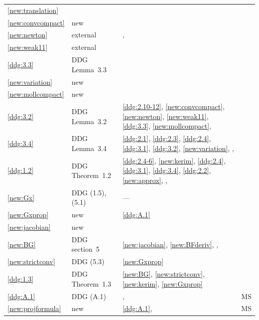 \documentclass[a4paper,twoside,leqno]{article}
\begin{document}
\begin{longtable}{p{}p{}p{}l}
        \ref{new:translation} & \\
    \ref{new:convcompact} & new & \cite[2.5.3, 2.5.14, 2.6.2, 2.10.21, 4.1.2]{Federer1969} & \\
    \ref{new:newton} & external & \cite[(2.12), (2.13), (2.17), Lemmas~4.1, 4.2]{Gilbarg2001a},
        \cite[2.4.9, 2.6.2]{Federer1969} & \\
    \ref{new:weak11} & external & \cite[Theorems~5.2.10, 5.3.3]{Grafakos2014} & \\
    \ref{ddg:3.3} & DDG Lemma~3.3 & \cite[2.4.9]{Federer1969} & \\
    \ref{new:variation} & new & \cite[2.2.5, 4.1.2, 4.1.5]{Federer1969} & \\
    \ref{new:mollcompact} & new & \cite[2.6.2, 2.9.9, 4.1.2, 4.1.5]{Federer1969} & \\
    \ref{ddg:3.2} & DDG Lemma~3.2 & \ref{ddg:2.10-12}, \ref{new:convcompact}, \ref{new:newton},
        \ref{new:weak11}, \ref{ddg:3.3}, \ref{new:mollcompact}, \cite[4.1.2,
        4.1.5]{Federer1969} & \\
    \ref{ddg:3.4} & DDG Lemma~3.4 & \ref{ddg:2.1}, \ref{ddg:2.3}, \ref{ddg:2.4}, \ref{ddg:3.1},
        \ref{ddg:3.2}, \ref{new:variation}, \cite[2.8.18, 2.9.11, 2.10.11]{Federer1969},
        \cite[2.6(2)(c), 2.8(1)]{Allard1972} & \\
    \ref{ddg:1.2} & DDG Theorem~1.2 & \ref{ddg:2.4-6}, \ref{new:kerim}, \ref{ddg:2.4},
        \ref{ddg:3.1}, \ref{ddg:3.4}, \ref{ddg:2.2}, \ref{new:approx}, \cite[2.6.2, 2.8.18, 2.9.8,
        2.10.6, 2.10.19(3), 2.10.35]{Federer1969}, \cite[3.5(1)(a)]{Allard1972} & \\
    \ref{new:Gx} & DDG (1.5), (5.1) & --- & \\
    \ref{new:Gxprop} & new & \ref{ddg:A.1} & \\
    \ref{new:jacobian} & new & \cite[1.3.4, 1.7.5]{Federer1969} & \\
    \ref{new:BG} & DDG section~5 & \ref{new:jacobian}, \ref{new:BFderiv},
        \cite[2.2(1)]{Allard1972}, \cite[1.3.4]{Federer1969} & \\
    \ref{new:strictconv} & DDG (5.3) & \ref{new:Gxprop} & \\
    \ref{ddg:1.3} & DDG Theorem~1.3 & \ref{new:BG}, \ref{new:strictconv}, \ref{new:kerim},
        \ref{new:Gxprop} & \\
    \ref{ddg:A.1} & DDG (A.1) & \cite[2.3, 2.3(3)]{Allard1972}, \cite[1.7.3]{Federer1969} & MS \\
    \ref{new:projformula} & new & \ref{ddg:A.1}, \cite[1.3.4]{Federer1969} & MS \\

\end{longtable}
\end{document}
